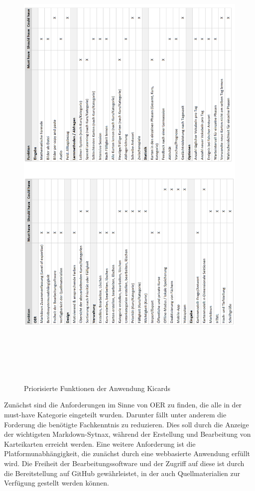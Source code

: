 \begin{figure}[htbp]
\begin{center}
\includegraphics[width = 15cm, height=23cm]{must3.png}
\caption{Priorisierte Funktionen der Anwendung Kicards}
\label{Must-,Should-, Could-Have der Anwendung Kicards}

\end{center}
\end{figure}

Zunächst sind die Anforderungen im Sinne von OER zu finden, die alle in der must-have Kategorie eingeteilt wurden. Darunter fällt unter anderem die Forderung die benötigte Fachkenntnis zu reduzieren. Dies soll durch die Anzeige der wichtigsten Markdown-Sytnax, während der Erstellung und Bearbeitung von Karteikarten erreicht werden. Eine weitere Anforderung ist die Platformunabhängigkeit, die zunächst durch eine webbasierte Anwendung erfüllt wird. Die Freiheit der Bearbeitungssoftware und der Zugriff auf diese ist durch die Bereitstellung auf GitHub gewährleistet, in der auch Quellmaterialien zur Verfügung gestellt werden können. \\

